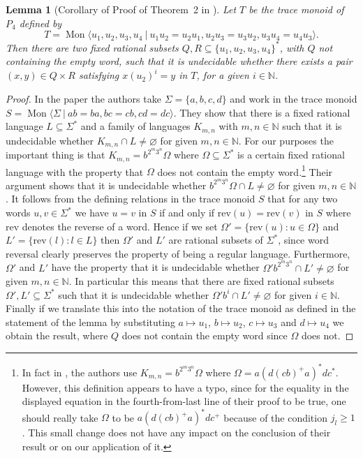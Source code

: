 \documentclass{amsart}
\newcommand{\Mpres}[2]{\operatorname{Mon}\bigl\langle #1\:|\:#2 \bigr\rangle}
\newcommand{\N}{\mathbb{N}}
\theoremstyle{plain}
\newtheorem{lemma}[theorem]{Lemma}
\theoremstyle{definition}
\begin{document}
\begin{lemma}[Corollary of Proof of Theorem~2 in \cite{Lohrey2008}] \label{thm: nondecidability}
Let $T$ be the trace monoid of $P_4$ defined by    
\[T = \Mpres{u_1, u_2, u_3, u_4}{
u_1u_2 = u_2u_1, 
u_2u_3 = u_3u_2, 
u_3u_4 = u_4u_3}.
\]
Then there are two fixed rational subsets $Q, R \subseteq \{u_1, u_2, u_3, u_4\}^*$, 
with $Q$ not containing the empty word,    
such that 
it is undecidable whether there exists a pair $(x,y) \in Q \times R$ satisfying $x(u_2)^i = y$ in $T$, for a given $i \in \N$.
\end{lemma}
\begin{proof} 
In the paper \cite[Proof of Theorem~2]{Lohrey2008} the authors take $\Sigma = \{a,b,c,d\}$ and work in the trace monoid $S = \Mpres{\Sigma}{ab=ba, bc=cb, cd=dc}$. They show that there is a fixed rational language $L \subseteq \Sigma^*$ and a family of languages $K_{m,n}$ with $m, n \in \mathbb{N}$ such that it is undecidable whether $K_{m,n} \cap L \neq \varnothing$ for given $m, n \in \mathbb{N}$. For our purposes the important thing is that $K_{m,n} = b^{2^m3^n} \Omega$ where $\Omega \subseteq \Sigma^*$ is a certain fixed rational language with the property that $\Omega$ does not contain the empty word.\footnote{In fact in \cite[Proof of Theorem~2]{Lohrey2008}, the authors use $K_{m,n}= b^{2^m3^n} \Omega$ where $\Omega = a(d(cb)^+a)^*dc^*$. However, this definition appears to have a typo, since for the equality in the displayed equation in the fourth-from-last line of their proof to be true, one should really take $\Omega$ to be $a(d(cb)^+a)^*dc^+$ because of the condition $j_l \geq 1$. This small change does not have any impact on the conclusion of their result or on our application of it.}        
Their argument shows that it is undecidable whether $b^{2^m3^n} \Omega \cap L \neq \varnothing$ for given $m, n \in \mathbb{N}$. 
It follows from the defining relations in the trace monoid $S$ that for any two words $u, v \in \Sigma^*$ we have $u=v$ in $S$ if and only if $\mathrm{rev}(u) = \mathrm{rev}(v)$ in $S$ where $\mathrm{rev}$ denotes the reverse of a word.  
Hence if we set $\Omega' = \{ \mathrm{rev}(u) : u \in \Omega \}$ and $L' = \{ \mathrm{rev}(l) : l \in L \}$ then $\Omega'$ and $L'$ are rational subsets of $\Sigma^*$, since word reversal clearly preserves the property of being a regular language. Furthermore, $\Omega'$ and $L'$ have the property that it is undecidable whether $\Omega' b^{2^m3^n} \cap L' \neq \varnothing$ for given $m, n \in \mathbb{N}$. 
In particular this means that 
there are fixed rational subsets $\Omega', L' \subseteq \Sigma^*$ such that 
it is undecidable whether $\Omega' b^{i} \cap L' \neq \varnothing$ for given $i \in \mathbb{N}$. 
Finally if we translate this into the notation of the trace monoid as defined in the statement of the lemma by substituting $a \mapsto u_1$, $b \mapsto u_2$, $c \mapsto u_3$ and $d \mapsto u_4$ we obtain the result, where $Q$ does not contain the empty word since $\Omega$ does not.  
  \end{proof}
\end{document}
